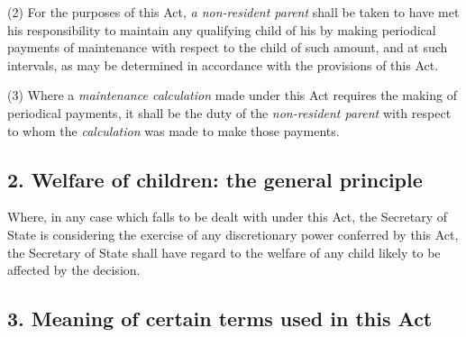 \documentclass[12pt,a4paper]{article}
\begin{document}
(2) For the purposes of this Act, 
\emph{a non-resident parent}  %
shall be taken to have met his responsibility to maintain any qualifying child of his by making periodical payments of maintenance with respect to the child of such amount, and at such intervals, as may be determined in accordance with the provisions of this Act.

(3) Where a 
\emph{maintenance calculation}  %
made under this Act requires the making of periodical payments, it shall be the duty of the 
\emph{non-resident parent}  %
with respect to whom the 
\emph{calculation}  %
was made to make those payments.

\subsection{2. Welfare of children: the general principle}

Where, in any case which falls to be dealt with under this Act, the 
Secretary of State  %
is considering the exercise of any discretionary power conferred by this Act, 
the Secretary of State  %
shall have regard to the welfare of any child likely to be affected by 
the  %
decision.


\subsection{3. Meaning of certain terms used in this Act}
\end{document}
